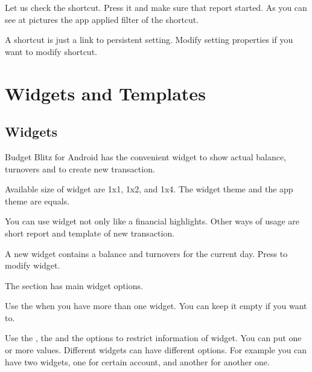 \documentclass[a4paper,10pt,english]{sphinxmanual}
\begin{document}
Let us check the shortcut. Press it and make sure that report started. As you can see at pictures the app
applied filter of the shortcut.

A shortcut is just a link to persistent setting. Modify setting properties if you want to modify shortcut.


\chapter{Widgets and Templates}
\label{\detokenize{widgets:widgets-and-templates}}\label{\detokenize{widgets:chapter-widgets}}\label{\detokenize{widgets::doc}}

\section{Widgets}
\label{\detokenize{widgets:widgets}}
Budget Blitz for Android has the convenient widget to show actual balance, turnovers and to create new transaction.


Available size of widget are 1x1, 1x2, and 1x4. The widget theme and the app theme are equals.

You can use widget not only like a financial highlights. Other ways of usage are short report
and template of new transaction.

\noindent{}
\noindent{}
\noindent{}

A new widget contains a balance and turnovers for the current day. Press 
to modify widget.

The  section has main widget options.

Use the  when you have more than one widget. You can keep it empty if you want to.

Use the , the  and the  options
to restrict information of widget. You can put one or more values. Different widgets
can have different options. For example you can have two widgets, one for
certain account, and another for another one.
\end{document}
